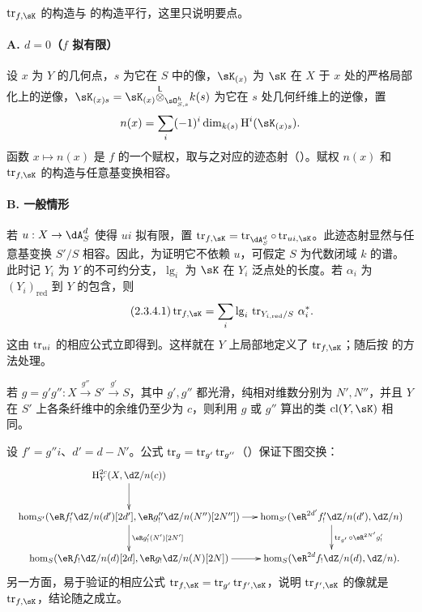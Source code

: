 \subsubsection{}\label{IV:2-3-4}
$\tr_{f,\sK}$ 的构造与 \cite[XVIII §2]{sga4} 的构造平行，这里只说明要点。

\paragraph{A. $d=0$（$f$ 拟有限）}
设 $x$ 为 $Y$ 的几何点，$s$ 为它在 $S$ 中的像，$\sK_{(x)}$ 为 $\sK$ 在 $X$ 于 $x$ 处的严格局部化上的逆像，$\sK_{(x)s}=\sK_{(x)}\lotimes_{\sO_{S,s}^h}k(s)$ 为它在 $s$ 处几何纤维上的逆像，置
\[
n(x)=\sum_i(-1)^i\dim_{k(s)}\h^i(\sK_{(x)s}).
\]
函数 $x\mapsto n(x)$ 是 $f$ 的一个赋权，取与之对应的迹态射（\cite[XVII 6.2.5]{sga4}）。赋权 $n(x)$ 和 $\tr_{f,\sK}$ 的构造与任意基变换相容。

\paragraph{B. 一般情形}
若 $u:X\to\dA_S^d$ 使得 $ui$ 拟有限，置 $\tr_{f,\sK}=\tr_{\dA_S^d}\circ\tr_{ui,\sK}$。此迹态射显然与任意基变换 $S'/S$ 相容。因此，为证明它不依赖 $u$，可假定 $S$ 为代数闭域 $k$ 的谱。此时记 $Y_i$ 为 $Y$ 的不可约分支，$\operatorname{lg}_i$ 为 $\sK$ 在 $Y_i$ 泛点处的长度。若 $\alpha_i$ 为 $(Y_i)_{\text{red}}$ 到 $Y$ 的包含，则
\begin{equation*}\tag{2.3.4.1}\label{IV:eq:2-3-4}
\tr_{f,\sK}=\sum_i\operatorname{lg}_i\,\tr_{Y_{i,\text{red}}/S}\,\alpha_i^*.
\end{equation*}
这由 $\operatorname{tr}_{ui}$ 的相应公式立即得到。这样就在 $Y$ 上局部地定义了 $\tr_{f,\sK}$；随后按 \cite[XVIII 2.9]{sga4} 的方法处理。

\begin{lemma}\label{IV:2-3-5}
若 $g=g'g'':X\xrightarrow{g''}S'\xrightarrow{g'}S$，其中 $g',g''$ 都光滑，纯相对维数分别为 $N',N''$，并且 $Y$ 在 $S'$ 上各条纤维中的余维仍至少为 $c$，则利用 $g$ 或 $g''$ 算出的类 $\cl(Y,\sK)$ 相同。
\end{lemma}
设 $f'=g''i$、$d'=d-N'$。公式 $\operatorname{tr}_g=\operatorname{tr}_{g'}\operatorname{tr}_{g''}$（\cite[XVIII 2.9, Var.\ 3]{sga4}）保证下图交换：
\[
\resizebox{\linewidth}{!}{$\xymatrix@C=15pt{
\h_Y^{2c}(X,\dZ/n(c))\ar[d]\\
\hom_{S'}(\eR f'_!\dZ/n(d')[2d'],\eR g''_!\dZ/n(N'')[2N''])\ar[r]\ar[d]^-{\eR g'_!(N')[2N']}&
\hom_{S'}(\eR^{2d'}f'_!\dZ/n(d'),\dZ/n)\ar[d]^-{\tr_{g'}\circ\eR^{2N'}g'_!}\\
\hom_S(\eR f_!\dZ/n(d)[2d],\eR g_!\dZ/n(N)[2N])\ar[r]&
\hom_S(\eR^{2d}f_!\dZ/n(d),\dZ/n).
}$}
\]
另一方面，易于验证的相应公式 $\tr_{f,\sK}=\tr_{g'}\tr_{f',\sK}$，说明 $\tr_{f',\sK}$ 的像就是 $\tr_{f,\sK}$，结论随之成立。

